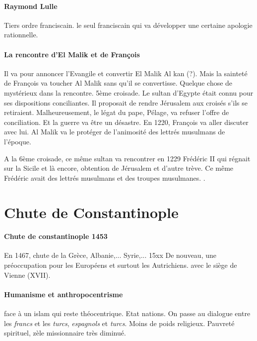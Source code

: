 \paragraph{Raymond Lulle} Tiers ordre franciscain. le seul franciscain qui va développer une certaine apologie rationnelle. 

\paragraph{La rencontre d'El Malik et de François} Il va pour annoncer l'Evangile et convertir El Malik Al kan (?). Mais la sainteté de François va toucher Al Malik sans qu'il se convertisse. Quelque chose de mystérieux dans la rencontre. 
5ème croisade. Le sultan d'Egypte était connu pour ses dispositions conciliantes. Il proposait de rendre Jérusalem aux croisés s'ils se retiraient. 
Malheureusement, le légat du pape, Pélage, va refuser l'offre de conciliation. Et la guerre va être un désastre.
En 1220, François va aller discuter avec lui. Al Malik va le protéger de l'animosité des lettrés musulmans de l'époque.

A la 6ème croisade, ce même sultan va rencontrer en 1229 Frédéric II qui régnait sur la Sicile et là encore, obtention de Jérusalem et d'autre trève. 
Ce même Frédéric avait des lettrés musulmans et des troupes musulmanes. .

\section{Chute de Constantinople}
\paragraph{Chute de constantinople 1453} En 1467, chute de la Grèce, Albanie,... Syrie,... 15xx
De nouveau, une préoccupation pour les Européens et surtout les Autrichiens. avec le siège de Vienne (XVII). 

\paragraph{Humanisme et anthropocentrisme} face à un islam qui reste théocentrique. 
Etat nations. On passe au dialogue entre les \textit{francs} et les \textit{turcs}, \textit{espagnols} et \textit{turcs}. Moins de poids religieux. Pauvreté spirituel, zèle missionnaire très diminué.

